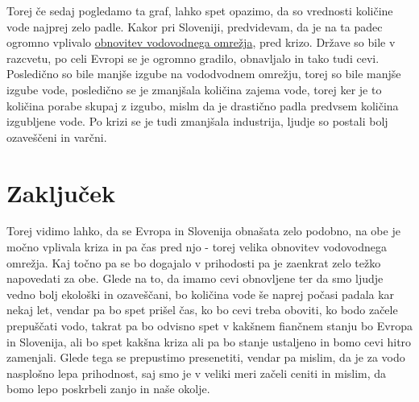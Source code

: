 \documentclass[11pt,a4paper]{article}
\begin{document}
Torej če sedaj pogledamo ta graf, lahko spet opazimo, da so vrednosti količine vode najprej zelo  padle. Kakor pri Sloveniji, predvidevam, da je na ta padec ogromno vplivalo \underline{obnovitev vodovodnega omrežja}, pred krizo. Države so bile v razcvetu, po celi Evropi se je ogromno gradilo, obnavljalo in tako tudi cevi.  Posledično so bile manjše izgube na vododvodnem omrežju, torej so bile manjše izgube vode, posledično se je zmanjšala količina zajema vode, torej ker je to količina porabe skupaj z izgubo, mislm da je drastično padla predvsem količina izgubljene vode.  Po krizi se je tudi zmanjšala industrija, ljudje so postali bolj ozaveščeni in varčni.\\

\section{Zaključek}
Torej vidimo lahko, da se Evropa in Slovenija obnašata zelo podobno, na obe je močno vplivala kriza in pa čas pred njo - torej velika obnovitev vodovodnega omrežja. Kaj točno pa se bo dogajalo v prihodosti pa je zaenkrat zelo težko napovedati za obe. Glede na to, da imamo cevi obnovljene ter da smo ljudje vedno bolj ekološki in ozaveščani, bo količina vode še naprej počasi padala kar nekaj let, vendar pa bo spet prišel čas, ko bo cevi treba oboviti, ko bodo začele prepuščati vodo, takrat pa bo odvisno spet v kakšnem fiančnem stanju bo Evropa in Slovenija, ali bo spet kakšna kriza ali pa bo stanje ustaljeno in bomo cevi hitro zamenjali. Glede tega se prepustimo presenetiti, vendar pa mislim, da je za vodo nasplošno lepa prihodnost, saj smo je v veliki meri začeli ceniti in mislim, da bomo lepo poskrbeli zanjo in naše okolje.
\end{document}
